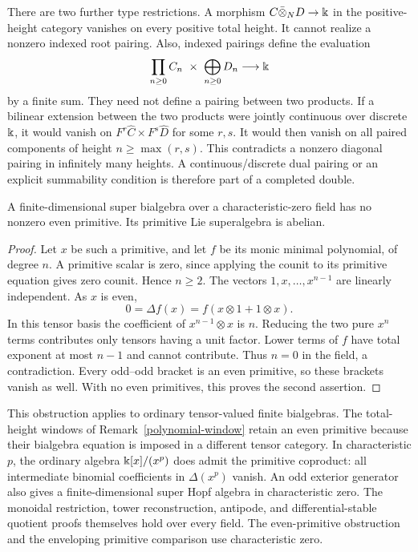 There are two further type restrictions.  A morphism
$C\bar\otimes_ND\to\Bbbk$ in the positive-height category vanishes on
every positive total height.  It cannot realize a nonzero indexed
root pairing.  Also, indexed pairings define the evaluation
\[
 \prod_{n\geq0}C_n\ \times\ \bigoplus_{n\geq0}D_n
 \longrightarrow\kk
\]
by a finite sum.  They need not define a pairing between two products.
If a bilinear extension between the two products were jointly continuous
over discrete $\Bbbk$, it would vanish on $F^r\widehat C\times
F^s\widehat D$ for some $r,s$.
It would then vanish on all paired components of height
$n\geq\max(r,s)$.  This contradicts a nonzero diagonal pairing in
infinitely many heights.  A continuous/discrete dual pairing or an
explicit summability condition is therefore part of a completed double.

\begin{proposition}
\label{finite-primitive-obstruction}
A finite-dimensional super bialgebra over a characteristic-zero field
has no nonzero even primitive.  Its primitive Lie superalgebra is abelian.
\end{proposition}

\begin{proof}
Let $x$ be such a primitive, and let $f$ be its monic minimal polynomial,
of degree $n$.  A primitive scalar is zero, since applying the counit to
its primitive equation gives zero counit.  Hence $n\geq2$.
The vectors $1,x,\ldots,x^{n-1}$ are linearly independent.
As $x$ is even,
\[
 0=\Delta f(x)=f(x\otimes1+1\otimes x).
\]
In this tensor basis the coefficient of $x^{n-1}\otimes x$ is $n$.
Reducing the two pure $x^n$ terms contributes only tensors having a unit
factor.  Lower terms of $f$ have total exponent at most $n-1$ and cannot
contribute.  Thus $n=0$ in the field, a contradiction.
Every odd--odd bracket is an even primitive, so these brackets vanish
as well.  With no even primitives, this proves the second assertion.
\end{proof}

This obstruction applies to ordinary tensor-valued finite bialgebras.
The total-height windows of Remark~\ref{polynomial-window} retain an
even primitive because their bialgebra equation is imposed in a different
tensor category.  In characteristic $p$, the ordinary algebra
$\Bbbk[x]/(x^p)$ does admit the primitive coproduct: all intermediate
binomial coefficients in $\Delta(x^p)$ vanish.
An odd exterior generator also gives a finite-dimensional super Hopf
algebra in characteristic zero.
The monoidal restriction, tower reconstruction, antipode, and
differential-stable quotient proofs themselves hold over every field.
The even-primitive obstruction and the enveloping primitive comparison
use characteristic zero.

